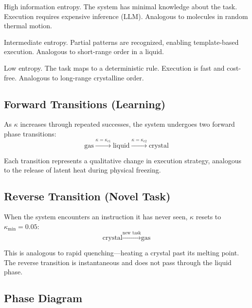 \documentclass[10pt,twocolumn]{article}
\newcommand{\kap}{\kappa}
\begin{document}
\begin{description}[leftmargin=*, itemsep=3pt]
  \item[Gas ($\kap < 0.3$):] High information entropy. The 
    system has minimal knowledge about the task. Execution 
    requires expensive inference (LLM). Analogous to molecules 
    in random thermal motion.
    
  \item[Liquid ($0.3 \leq \kap < 0.8$):] Intermediate 
    entropy. Partial patterns are recognized, enabling 
    template-based execution. Analogous to short-range order 
    in a liquid.
    
  \item[Crystal ($\kap \geq 0.8$):] Low entropy. The task 
    maps to a deterministic rule. Execution is fast and 
    cost-free. Analogous to long-range crystalline order.
\end{description}

\subsection{Forward Transitions (Learning)}

As $\kap$ increases through repeated successes, the system 
undergoes two forward phase transitions:
\begin{equation}
  \text{gas} 
  \xrightarrow{\kap = \kap_{c1}} 
  \text{liquid} 
  \xrightarrow{\kap = \kap_{c2}} 
  \text{crystal}
\end{equation}

Each transition represents a qualitative change in execution 
strategy, analogous to the release of latent heat during 
physical freezing.

\subsection{Reverse Transition (Novel Task)}

When the system encounters an instruction it has never seen, 
$\kap$ resets to $\kap_{\min} = 0.05$:
\begin{equation}
  \text{crystal} 
  \xrightarrow{\text{new task}} 
  \text{gas}
\end{equation}

This is analogous to rapid quenching---heating a crystal past 
its melting point. The reverse transition is instantaneous and 
does not pass through the liquid phase.

\subsection{Phase Diagram}
\end{document}
